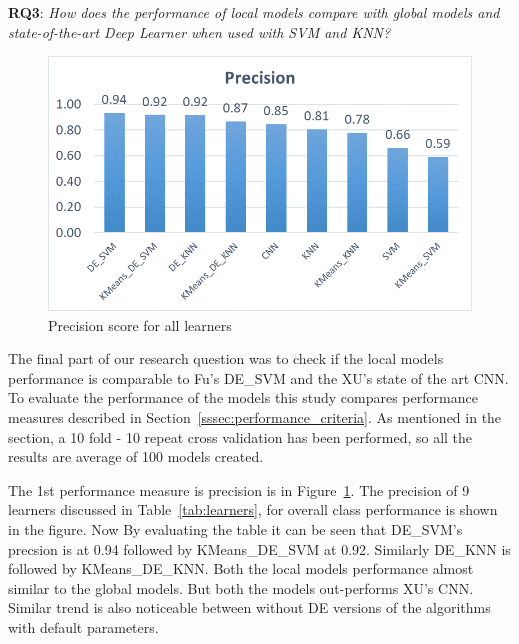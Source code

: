 \documentclass[sigconf]{acmart}
\theoremstyle{break}
\begin{document}
    \textbf{RQ3}: {\em  How does the performance of local models compare with global models and state-of-the-art Deep Learner when used with SVM and KNN?} 
    
    \begin{figure}
        \centering
        \includegraphics[width=\linewidth]{fig/precision.png}
        \caption{Precision score for all learners}
        \label{fig:precison}
    \end{figure}
    
    The final part of our research question was to check if the local models performance is comparable to Fu's DE\_SVM and the XU's state of the art CNN. To evaluate the performance of the models this study compares performance measures described in Section~\ref{sssec:performance_criteria}. As mentioned in the section, a 10 fold - 10 repeat cross validation has been performed, so all the results are average of 100 models created. 
    
    The 1st performance measure is precision is in Figure~\ref{fig:precison}. The precision of 9 learners discussed in Table~\ref{tab:learners}, for overall class performance is shown in the figure. Now By evaluating the table it can be seen that DE\_SVM's precsion is at 0.94 followed by KMeans\_DE\_SVM at 0.92. Similarly DE\_KNN is followed by KMeans\_DE\_KNN. Both the local models performance almost similar to the global models. But both the models out-performs XU's CNN. Similar trend is also noticeable between without DE versions of the algorithms with default parameters.
    
\end{document}

